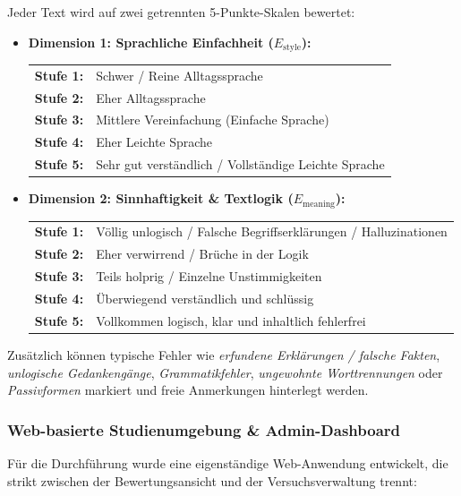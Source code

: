 Jeder Text wird auf zwei getrennten 5-Punkte-Skalen bewertet:
\begin{itemize}
    \item \textbf{Dimension 1: Sprachliche Einfachheit ($E_{\text{style}}$):}\\
    \begin{tabular}{@{\quad}ll}
        \textbf{Stufe 1:} & Schwer / Reine Alltagssprache \\
        \textbf{Stufe 2:} & Eher Alltagssprache \\
        \textbf{Stufe 3:} & Mittlere Vereinfachung (Einfache Sprache) \\
        \textbf{Stufe 4:} & Eher Leichte Sprache \\
        \textbf{Stufe 5:} & Sehr gut verständlich / Vollständige Leichte Sprache \\
    \end{tabular}
    \item \textbf{Dimension 2: Sinnhaftigkeit \& Textlogik ($E_{\text{meaning}}$):}\\
    \begin{tabular}{@{\quad}ll}
        \textbf{Stufe 1:} & Völlig unlogisch / Falsche Begriffserklärungen / Halluzinationen \\
        \textbf{Stufe 2:} & Eher verwirrend / Brüche in der Logik \\
        \textbf{Stufe 3:} & Teils holprig / Einzelne Unstimmigkeiten \\
        \textbf{Stufe 4:} & Überwiegend verständlich und schlüssig \\
        \textbf{Stufe 5:} & Vollkommen logisch, klar und inhaltlich fehlerfrei \\
    \end{tabular}
\end{itemize}
Zusätzlich können typische Fehler wie \textit{erfundene Erklärungen / falsche Fakten}, \textit{unlogische Gedankengänge}, \textit{Grammatikfehler}, \textit{ungewohnte Worttrennungen} oder \textit{Passivformen} markiert und freie Anmerkungen hinterlegt werden.

\subsubsection{Web-basierte Studienumgebung \& Admin-Dashboard}
\label{sec:experten_plattform}

Für die Durchführung wurde eine eigenständige Web-Anwendung entwickelt, die strikt zwischen der Bewertungsansicht und der Versuchsverwaltung trennt:

